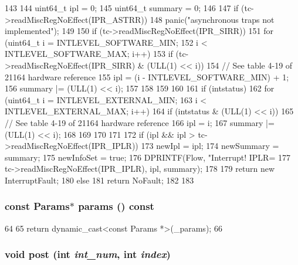 \begin{DoxyCode}
143     {
144         uint64_t ipl = 0;
145         uint64_t summary = 0;
146 
147         if (tc->readMiscRegNoEffect(IPR_ASTRR))
148             panic("asynchronous traps not implemented\n");
149 
150         if (tc->readMiscRegNoEffect(IPR_SIRR)) {
151             for (uint64_t i = INTLEVEL_SOFTWARE_MIN;
152                  i < INTLEVEL_SOFTWARE_MAX; i++) {
153                 if (tc->readMiscRegNoEffect(IPR_SIRR) & (ULL(1) << i)) {
154                     // See table 4-19 of 21164 hardware reference
155                     ipl = (i - INTLEVEL_SOFTWARE_MIN) + 1;
156                     summary |= (ULL(1) << i);
157                 }
158             }
159         }
160 
161         if (intstatus) {
162             for (uint64_t i = INTLEVEL_EXTERNAL_MIN;
163                  i < INTLEVEL_EXTERNAL_MAX; i++) {
164                 if (intstatus & (ULL(1) << i)) {
165                     // See table 4-19 of 21164 hardware reference
166                     ipl = i;
167                     summary |= (ULL(1) << i);
168                 }
169             }
170         }
171 
172         if (ipl && ipl > tc->readMiscRegNoEffect(IPR_IPLR)) {
173             newIpl = ipl;
174             newSummary = summary;
175             newInfoSet = true;
176             DPRINTF(Flow, "Interrupt! IPLR=%
177                     tc->readMiscRegNoEffect(IPR_IPLR), ipl, summary);
178 
179             return new InterruptFault;
180         } else {
181             return NoFault;
182         }
183     }
\end{DoxyCode}
\hypertarget{classAlphaISA_1_1Interrupts_acd3c3feb78ae7a8f88fe0f110a718dff}{
\subsubsection[{params}]{\setlength{\rightskip}{0pt plus 5cm}const {\bf Params}$\ast$ params () const}}
\label{classAlphaISA_1_1Interrupts_acd3c3feb78ae7a8f88fe0f110a718dff}



\begin{DoxyCode}
64     {
65         return dynamic_cast<const Params *>(_params);
66     }
\end{DoxyCode}
\hypertarget{classAlphaISA_1_1Interrupts_a24c6c4fbdc0605bcd015ce06f194e4b4}{
\subsubsection[{post}]{\setlength{\rightskip}{0pt plus 5cm}void post (int {\em int\_\-num}, \/  int {\em index})}}
\label{classAlphaISA_1_1Interrupts_a24c6c4fbdc0605bcd015ce06f194e4b4}



